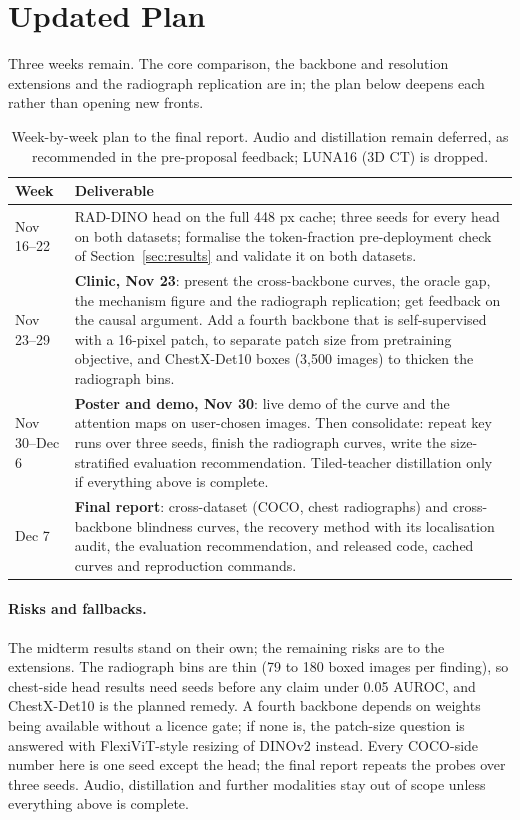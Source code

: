 \documentclass[10pt,letterpaper,twocolumn]{article}
\begin{document}
\section{Updated Plan}
\label{sec:plan}
Three weeks remain. The core comparison, the backbone and resolution extensions and the
radiograph replication are in; the plan below deepens each rather than opening new fronts.

\begin{table}[h]
\centering\small
\caption{Week-by-week plan to the final report. Audio and distillation remain deferred, as
recommended in the pre-proposal feedback; LUNA16 (3D CT) is dropped.}
\label{tab:plan}
\begin{tabular}{p{0.95in}p{2.1in}}
\toprule
Week & Deliverable \\
\midrule
Nov 16--22 &
  RAD-DINO head on the full 448 px cache; three seeds for every head on both datasets;
  formalise the token-fraction pre-deployment check of Section~\ref{sec:results} and
  validate it on both datasets. \\
Nov 23--29 &
  \textbf{Clinic, Nov 23}: present the cross-backbone curves, the oracle gap, the mechanism
  figure and the radiograph replication; get feedback on the causal argument. Add a fourth
  backbone that is self-supervised with a 16-pixel patch, to separate patch size from
  pretraining objective, and ChestX-Det10 boxes (3,500 images) to thicken the radiograph bins. \\
Nov 30--Dec 6 &
  \textbf{Poster and demo, Nov 30}: live demo of the curve and the attention maps on
  user-chosen images. Then consolidate: repeat key runs over three seeds, finish the
  radiograph curves, write the size-stratified evaluation recommendation. Tiled-teacher
  distillation only if everything above is complete. \\
Dec 7 &
  \textbf{Final report}: cross-dataset (COCO, chest radiographs) and cross-backbone blindness
  curves, the recovery method with its localisation audit, the evaluation recommendation, and
  released code, cached curves and reproduction commands. \\
\bottomrule
\end{tabular}
\end{table}

\paragraph{Risks and fallbacks.}
The midterm results stand on their own; the remaining risks are to the extensions. The
radiograph bins are thin (79 to 180 boxed images per finding), so chest-side head results
need seeds before any claim under 0.05 AUROC, and ChestX-Det10 is the planned remedy. A
fourth backbone depends on weights being available without a licence gate; if none is, the
patch-size question is answered with FlexiViT-style resizing of DINOv2 instead. Every
COCO-side number here is one seed except the head; the final report repeats the probes over
three seeds. Audio, distillation and further modalities stay out of scope unless everything
above is complete.



\end{document}

